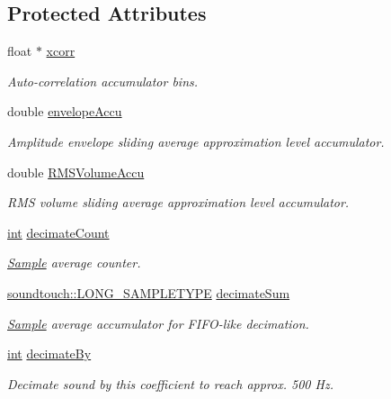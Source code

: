 \subsection*{Protected Attributes}
\begin{DoxyCompactItemize}
\item 
float $\ast$ \hyperlink{classsoundtouch_1_1_b_p_m_detect_ab18e3bdf3814375eab8c7dffe0e7e857}{xcorr}
\begin{DoxyCompactList}\small\item\em Auto-\/correlation accumulator bins. \end{DoxyCompactList}\item 
double \hyperlink{classsoundtouch_1_1_b_p_m_detect_a0bb45b54b872a9a88ed114cadc32a02f}{envelope\+Accu}
\begin{DoxyCompactList}\small\item\em Amplitude envelope sliding average approximation level accumulator. \end{DoxyCompactList}\item 
double \hyperlink{classsoundtouch_1_1_b_p_m_detect_af5b5e5634dbef9bcb0f6a1b883aa2aef}{R\+M\+S\+Volume\+Accu}
\begin{DoxyCompactList}\small\item\em R\+MS volume sliding average approximation level accumulator. \end{DoxyCompactList}\item 
\hyperlink{xmltok_8h_a5a0d4a5641ce434f1d23533f2b2e6653}{int} \hyperlink{classsoundtouch_1_1_b_p_m_detect_aae07e752a9f3133e46f20eda269bc5e6}{decimate\+Count}
\begin{DoxyCompactList}\small\item\em \hyperlink{struct_sample}{Sample} average counter. \end{DoxyCompactList}\item 
\hyperlink{namespacesoundtouch_a6d7c3b986241334e59ba402af1bbc127}{soundtouch\+::\+L\+O\+N\+G\+\_\+\+S\+A\+M\+P\+L\+E\+T\+Y\+PE} \hyperlink{classsoundtouch_1_1_b_p_m_detect_a7d19d38a72aeff0da916284b4789ccd6}{decimate\+Sum}
\begin{DoxyCompactList}\small\item\em \hyperlink{struct_sample}{Sample} average accumulator for F\+I\+F\+O-\/like decimation. \end{DoxyCompactList}\item 
\hyperlink{xmltok_8h_a5a0d4a5641ce434f1d23533f2b2e6653}{int} \hyperlink{classsoundtouch_1_1_b_p_m_detect_ab7fb5288ebbeec9267a663366445109f}{decimate\+By}
\begin{DoxyCompactList}\small\item\em Decimate sound by this coefficient to reach approx. 500 Hz. \end{DoxyCompactList}\item 

\end{DoxyCompactItemize}
